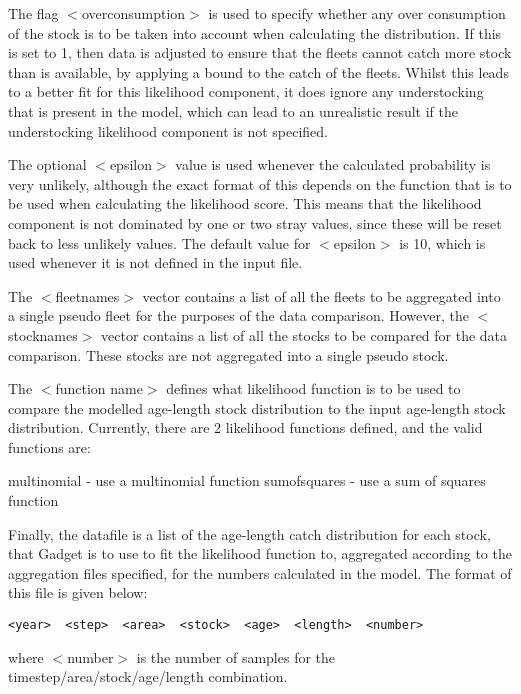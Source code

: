 \documentclass [a4paper, 10pt]{book}
\begin{document}
The flag $<$overconsumption$>$ is used to specify whether any over consumption of the stock is to be taken into account when calculating the distribution.  If this is set to 1, then data is adjusted to ensure that the fleets cannot catch more stock than is available, by applying a bound to the catch of the fleets.  Whilst this leads to a better fit for this likelihood component, it does ignore any understocking that is present in the model, which can lead to an unrealistic result if the understocking likelihood component is not specified.

\bigskip
The optional $<$epsilon$>$ value is used whenever the calculated probability is very unlikely, although the exact format of this depends on the function that is to be used when calculating the likelihood score.  This means that the likelihood component is not dominated by one or two stray values, since these will be reset back to less unlikely values.  The default value for $<$epsilon$>$ is 10, which is used whenever it is not defined in the input file.

\bigskip
The $<$fleetnames$>$ vector contains a list of all the fleets to be aggregated into a single pseudo fleet for the purposes of the data comparison.  However, the $<$stocknames$>$ vector contains a list of all the stocks to be compared for the data comparison.  These stocks are not aggregated into a single pseudo stock.

\bigskip
The $<$function name$>$ defines what likelihood function is to be used to compare the modelled age-length stock distribution to the input age-length stock distribution.  Currently, there are 2 likelihood functions defined, and the  valid functions are:

\bigskip
multinomial - use a multinomial function\newline
sumofsquares - use a sum of squares function

\bigskip
Finally, the datafile is a list of the age-length catch distribution for each stock, that Gadget is to use to fit the likelihood function to, aggregated according to the aggregation files specified, for the numbers calculated in the model.  The format of this file is given below:

{\small\begin{verbatim}
<year>  <step>  <area>  <stock>  <age>  <length>  <number>
\end{verbatim}}

where $<$number$>$ is the number of samples for the timestep/area/stock/age/length combination.
\end{document}
